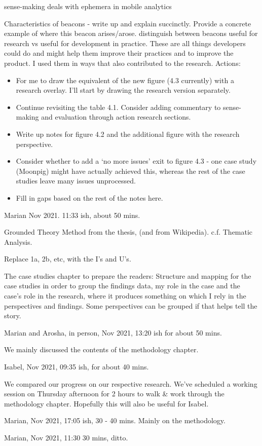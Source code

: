 sense-making deals with ephemera in mobile analytics 

Characteristics of beacons - write up and explain succinctly. Provide a concrete example of where this beacon arises/arose. distinguish between beacons useful for research vs useful for development in practice. These are all things developers could do and might help them improve their practices and to improve the product. I used them in ways that also contributed to the research.  
Actions: 
\begin{itemize}
    \item For me to draw the equivalent of the new figure (4.3 currently) with a research overlay. I'll start by drawing the research version separately. 
    \item Continue revisiting the table 4.1. Consider adding commentary to sense-making and evaluation through action research sections.
    \item Write up notes for figure 4.2 and the additional figure with the research perspective. 
    \item Consider whether to add a `no more issues' exit to figure 4.3 - one case study (Moonpig) might have actually achieved this, whereas the rest of the case studies leave many issues unprocessed.
    \item Fill in gaps based on the rest of the notes here.
\end{itemize}

\dotfill 

Marian  Nov 2021. 11:33 ish, about 50 mins.

Grounded Theory Method from the thesis, (and from Wikipedia). c.f. Thematic Analysis.

Replace 1a, 2b, etc, with the I's and U's.

The case studies chapter to prepare the readers:
Structure and mapping for the case studies in order to group the findings 
data, my role in the case and the case's role in the research, where it produces something on which I rely in the perspectives and findings. Some perspectives can be grouped if that helps tell the story.

\dotfill

Marian and Arosha, in person,  Nov 2021, 13:20 ish for about 50 mins.

We mainly discussed the contents of the methodology chapter.

\dotfill

Isabel,  Nov 2021, 09:35 ish, for about 40 mins. 

We compared our progress on our respective research. We've scheduled a working session on Thursday afternoon for 2 hours to walk \& work through the methodology chapter. Hopefully this will also be useful for Isabel.

\dotfill

Marian,  Nov 2021, 17:05 ish, 30 - 40 mins. Mainly on the methodology.

\dotfill

Marian,  Nov 2021, 11:30 30 mins, ditto. 

\clearpage